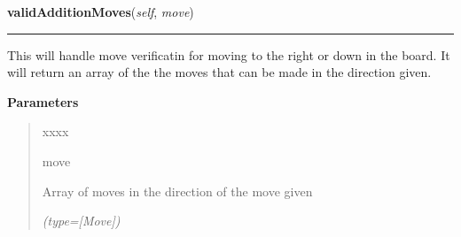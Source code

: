     \vspace{0.5ex}

\hspace{.8\funcindent}\begin{boxedminipage}{\funcwidth}

    \raggedright \textbf{validAdditionMoves}(\textit{self}, \textit{move})

    \vspace{-1.5ex}

    \rule{\textwidth}{0.5\fboxrule}
\setlength{\parskip}{2ex}
    This will handle move verificatin for moving to the right or down in 
    the board. It will return an array of the the moves that can be made in
    the direction given.

\setlength{\parskip}{1ex}
      \textbf{Parameters}
      \vspace{-1ex}

      \begin{quote}
        \begin{Ventry}{xxxx}

          \item[move]

          Array of moves in the direction of the move given

            {\it (type=[Move])}

        \end{Ventry}

      \end{quote}

    \end{boxedminipage}

    \label{UnBlockMe:Map:Map:Map:validSubtractionMoves}

    \vspace{0.5ex}

